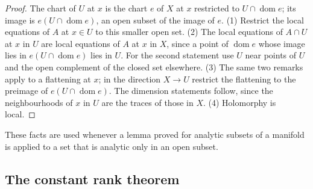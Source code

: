 \begin{proof}
\leanok
The chart of \(U\) at \(x\) is the chart \(e\) of \(X\) at \(x\) restricted to \(U\cap\operatorname{dom}e\); its image is \(e(U\cap\operatorname{dom}e)\), an open subset of the
image of \(e\). (1) Restrict the local equations of \(A\) at \(x\in U\) to this smaller open set. (2) The local equations of \(A\cap U\) at \(x\) in \(U\) are local
equations of \(A\) at \(x\) in \(X\), since a point of \(\operatorname{dom}e\) whose image lies in \(e(U\cap\operatorname{dom}e)\) lies in \(U\). For the second
statement use \(U\) near points of \(U\) and the open complement of the closed set elsewhere. (3) The same two remarks apply to a flattening at \(x\); in
the direction \(X\to U\) restrict the flattening to the preimage of \(e(U\cap\operatorname{dom}e)\). The dimension statements follow, since the neighbourhoods
of \(x\) in \(U\) are the traces of those in \(X\). (4) Holomorphy is local.
\end{proof}
These facts are used whenever a lemma proved for analytic subsets of a manifold is applied to a set that is analytic only in an open subset.

\subsection{The constant rank theorem}


